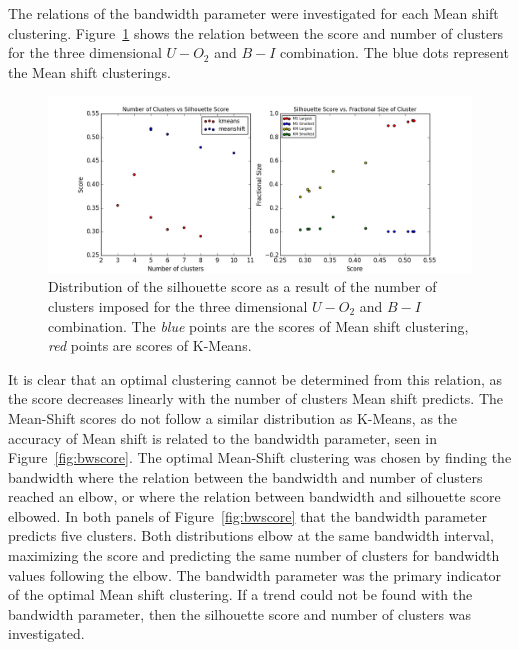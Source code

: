 The relations of the bandwidth parameter were investigated for each Mean shift clustering.
Figure~\ref{fig:bad_ms} shows the relation between the score and number of clusters for the three dimensional $U - O_{2}$ and $B - I$ combination.
The blue dots represent the Mean shift clusterings.

\begin{figure}[H]
\centering
\includegraphics[width=\linewidth]{figs/methods/silhouette_score_bad_ms}
\caption{Distribution of the silhouette score as a result of the number of clusters imposed for the three dimensional $U - O_{2}$ and $B - I$ combination. The \textit{blue} points are the scores of Mean shift clustering, \textit{red} points are scores of K-Means.}
\label{fig:bad_ms}
\end{figure}

It is clear that an optimal clustering cannot be determined from this relation, as the score decreases linearly with the number of clusters Mean shift predicts.
The Mean-Shift scores do not follow a similar distribution as K-Means, as the accuracy of Mean shift is related to the bandwidth parameter, seen in Figure~\ref{fig:bwscore}.
The optimal Mean-Shift clustering was chosen by finding the bandwidth where the relation between the bandwidth and number of clusters reached an elbow, or where the relation between bandwidth and silhouette score elbowed.
In both panels of Figure~\ref{fig:bwscore} that the bandwidth parameter predicts five clusters.
Both distributions elbow at the same bandwidth interval, maximizing the score and predicting the same number of clusters for bandwidth values following the elbow.
The bandwidth parameter was the primary indicator of the optimal Mean shift clustering.
If a trend could not be found with the bandwidth parameter, then the silhouette score and number of clusters was investigated.

